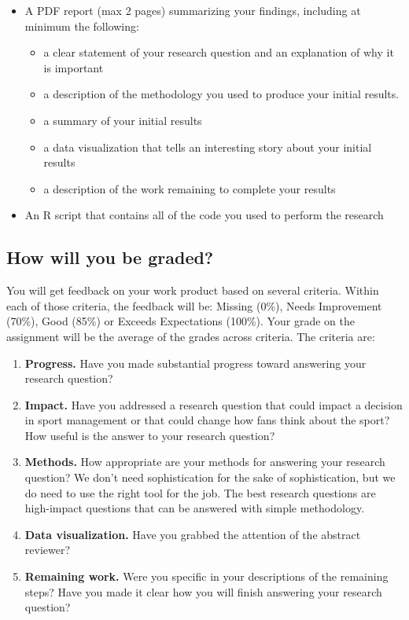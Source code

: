 \documentclass{article}
\begin{document}
        \begin{itemize}
          \item A PDF report (max 2 pages) summarizing your findings, including at minimum the following:
          \begin{itemize}
            \item a clear statement of your research question and an explanation of why it is important
            \item a description of the methodology you used to produce your initial results.
            \item a summary of your initial results
            \item a data visualization that tells an interesting story about your initial results
            \item a description of the work remaining to complete your results
          \end{itemize}
          \item An R script that contains all of the code you used to perform the research
        \end{itemize}

    \subsection*{\sc How will you be graded?}

      You will get feedback on your work product based on several criteria. Within each of those criteria, the feedback will be: Missing (0\%), Needs Improvement (70\%), Good (85\%) or Exceeds Expectations (100\%). Your grade on the assignment will be the average of the grades across criteria. The criteria are:
      \begin{enumerate}
        \item {\bf Progress.} Have you made substantial progress toward answering your research question?
        \item {\bf Impact.} Have you addressed a research question that could impact a decision in sport management or that could change how fans think about the sport? How useful is the answer to your research question?
        \item {\bf Methods.} How appropriate are your methods for answering your research question? We don't need sophistication for the sake of sophistication, but we do need to use the right tool for the job. The best research questions are high-impact questions that can be answered with simple methodology.
        \item {\bf Data visualization.} Have you grabbed the attention of the abstract reviewer?
        \item {\bf Remaining work.} Were you specific in your descriptions of the remaining steps? Have you made it clear how you will finish answering your research question?
      \end{enumerate}
  
\end{document}
